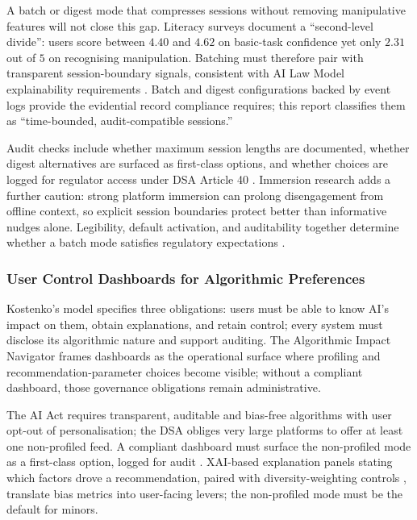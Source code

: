 \documentclass[11pt]{article}
\begin{document}
A batch or digest mode that compresses sessions without removing manipulative features will not close this gap. Literacy surveys document a ``second-level divide'': users score between $4.40$ and $4.62$ on basic-task confidence \parencites[10]{9360054} yet only $2.31$ out of $5$ on recognising manipulation. Batching must therefore pair with transparent session-boundary signals, consistent with AI Law Model explainability requirements \parencites[68]{2977039}[69]{2977039}. Batch and digest configurations backed by event logs \parencites[242]{2977039} provide the evidential record compliance requires; this report classifies them as ``time-bounded, audit-compatible sessions.''

Audit checks include whether maximum session lengths are documented, whether digest alternatives are surfaced as first-class options, and whether choices are logged for regulator access under DSA Article 40 \parencites[59]{2702055}[19]{3195574}. Immersion research \parencites[8]{9529573} adds a further caution: strong platform immersion can prolong disengagement from offline context, so explicit session boundaries protect better than informative nudges alone. Legibility, default activation, and auditability together determine whether a batch mode satisfies regulatory expectations \parencites[148]{2977039}[390]{7896734}.

\subsubsection{User Control Dashboards for Algorithmic Preferences}
\label{sec:user_control_dashboards} Kostenko's model specifies \parencites[22]{2977039} three obligations: users must be able to know AI's impact on them, obtain explanations, and retain control; every system must disclose its algorithmic nature and support auditing. The Algorithmic Impact Navigator frames \parencites[2]{2742041} dashboards as the operational surface where profiling and recommendation-parameter choices become visible; without a compliant dashboard, those governance obligations remain administrative.

The AI Act requires transparent, auditable and bias-free algorithms with user opt-out of personalisation; the DSA obliges \parencites[8]{5142478}[12]{6502223} very large platforms to offer at least one non-profiled feed. A compliant dashboard must surface the non-profiled mode as a first-class option, logged for audit \parencites[12]{6502223}[21]{3195574}. XAI-based explanation panels stating which factors drove a recommendation, paired with diversity-weighting controls \parencites[3]{3303310}[8]{5142478}, translate bias metrics into user-facing levers; the non-profiled mode must be the default for minors.
\end{document}
